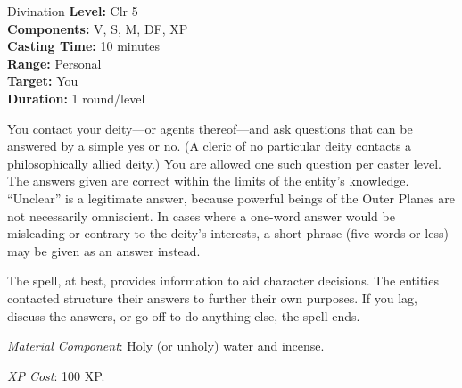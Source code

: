 {Divination}
{
	\textbf{Level:}
	Clr 5\\
	\textbf{Components:}
	V, S, M, DF, XP\\
	\textbf{Casting Time:}
	10 minutes\\
	\textbf{Range:}
	Personal\\
	\textbf{Target:}
	You\\
	\textbf{Duration:}
	1 round/level\\
}
{
	You contact your deity---or agents thereof---and ask questions that can be answered by a simple yes or no. (A cleric of no particular deity contacts a philosophically allied deity.) You are allowed one such question per caster level. The answers given are correct within the limits of the entity's knowledge. ``Unclear'' is a legitimate answer, because powerful beings of the Outer Planes are not necessarily omniscient. In cases where a one-word answer would be misleading or contrary to the deity's interests, a short phrase (five words or less) may be given as an answer instead.

	The spell, at best, provides information to aid character decisions. The entities contacted structure their answers to further their own purposes. If you lag, discuss the answers, or go off to do anything else, the spell ends.

	\textit{Material Component}:
	Holy (or unholy) water and incense.

	\textit{XP Cost}:
	100 XP.

}
